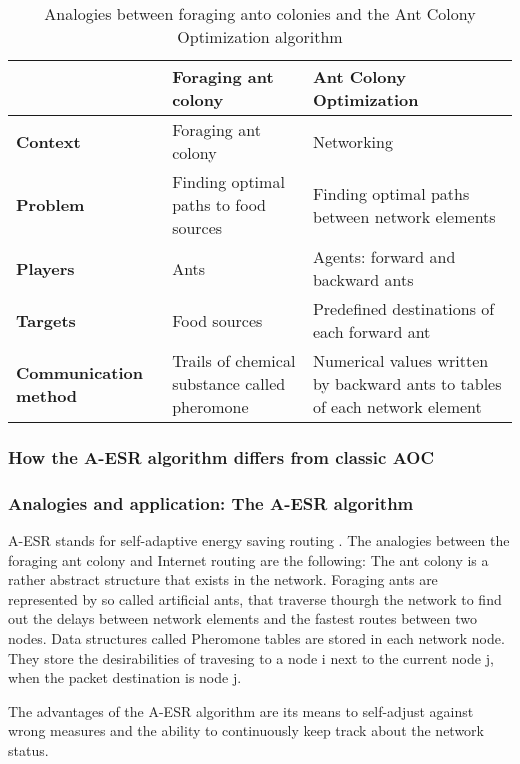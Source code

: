 \documentclass{IWORK2014}
\begin{document}
\begin{table}
	\begin{tabularx}{\textwidth}{|X|X|X|}
		\hline & \textbf{Foraging ant colony} & \textbf{Ant Colony Optimization} \\ \hline
		\textbf{Context} & Foraging ant colony & Networking \\ \hline
		\textbf{Problem} & Finding optimal paths to food sources & Finding optimal paths between network elements \\ \hline
		\textbf{Players} & Ants & Agents: forward and backward ants \\ \hline
		\textbf{Targets} & Food sources & Predefined destinations of each forward ant \\ \hline
		\textbf{Communication method} & Trails of chemical substance called pheromone & Numerical values written by backward ants to tables of each network element \\ \hline
	\end{tabularx}
	\caption{Analogies between foraging anto colonies and the Ant Colony Optimization algorithm}
	\label{tbl:analogies_ant}
\end{table}

\subsubsection{How the A-ESR algorithm differs from classic AOC}


\subsubsection{Analogies and application: The A-ESR algorithm}
A-ESR stands for self-adaptive energy saving routing \cite{kim2012ant}. The analogies between the foraging ant colony and Internet routing are the following: The ant colony is a rather abstract structure that exists in the network. Foraging ants are represented by so called artificial ants, that traverse thourgh the network to find out the delays between network elements and the fastest routes between two nodes. Data structures called Pheromone tables are stored in each network node. They store the desirabilities of travesing to a node i next to the current node j, when the packet destination is node j.

The advantages of the A-ESR algorithm are its means to self-adjust against wrong measures and the ability to continuously keep track about the network status.
\end{document}
